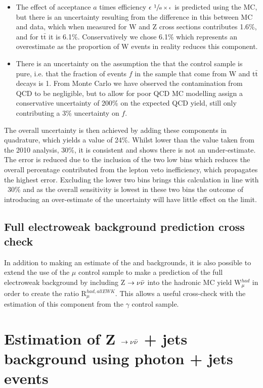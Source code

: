 \begin{itemize}
\begin{itemize}
\end{itemize}
\item The effect of acceptance $a$ times efficiency $\epsilon$ $\sfrac{1}{a \times \epsilon}$ is predicted using the MC, but there is an uncertainty resulting from the difference in this between MC and data, which when measured for W and Z cross sections contributes 1.6\%, and for t$\bar{\textrm{t}}$ it is 6.1\%. Conservatively we chose 6.1\% which represents an overestimate as the proportion of W events in reality reduces this component.
\item There is an uncertainty on the assumption the that the control sample is pure, i.e. that the fraction of events $f$ in the sample that come from W and t$\bar{\textrm{t}}$ decays is 1. From Monte Carlo we have observed the contamination from QCD to be negligible, but to allow for poor QCD MC modelling assign a conservative uncertainty of 200\% on the expected QCD yield, still only contributing a 3\% uncertainty on $f$.
\end{itemize}

The overall uncertainty is then achieved by adding these components in quadrature, which yields a value of 24\%. Whilst lower than the value taken from the 2010 analysis, 30\%, it is consistent and shows there is not an under-estimate. The error is reduced due to the inclusion of the two low \HT bins which reduces the overall percentage contributed from the lepton veto inefficiency, which propagates the highest error. Excluding the lower two bins brings this calculation in line with ~30\% and as the overall sensitivity is lowest in these two bins the outcome of introducing an over-estimate of the uncertainty will have little effect on the limit. 



\subsection{Full electroweak background prediction cross check}


In addition to making an estimate of the \ttj and \wj backgrounds, it is also possible to extend the use of the $\mu$ control sample to make a prediction of the full electroweak background by including Z $\rightarrow \nu \bar{\nu}$ into the hadronic MC yield W$^{had}_{\mu}$ in order to create the ratio R$^{had,allEWK}_{\mu}$. This allows a useful cross-check with the estimation of this component from the $\gamma$ control sample.

\section{Estimation of Z $\rightarrow \nu \bar{\nu}$ + jets background using photon + jets events}

